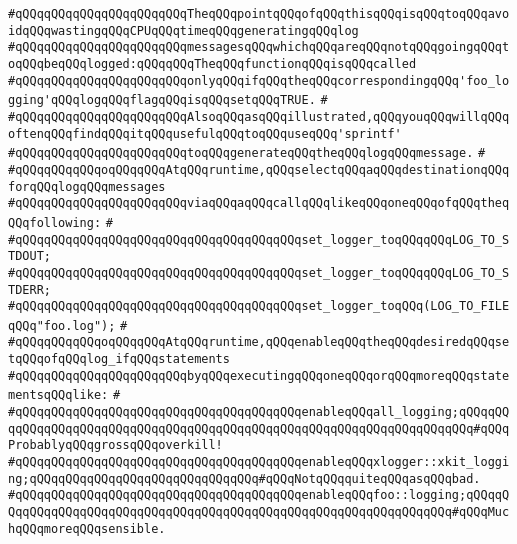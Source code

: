 \verb|#qQQqqQQqqQQqqQQqqQQqqQQqTheqQQqpointqQQqofqQQqthisqQQqisqQQqtoqQQqavoidqQQqwastingqQQqCPUqQQqtimeqQQqgeneratingqQQqlog|\newline
\verb|#qQQqqQQqqQQqqQQqqQQqqQQqmessagesqQQqwhichqQQqareqQQqnotqQQqgoingqQQqtoqQQqbeqQQqlogged:qQQqqQQqTheqQQqfunctionqQQqisqQQqcalled|\newline
\verb|#qQQqqQQqqQQqqQQqqQQqqQQqonlyqQQqifqQQqtheqQQqcorrespondingqQQq'foo_logging'qQQqlogqQQqflagqQQqisqQQqsetqQQqTRUE.|\newline
\verb|#|\newline
\verb|#qQQqqQQqqQQqqQQqqQQqqQQqAlsoqQQqasqQQqillustrated,qQQqyouqQQqwillqQQqoftenqQQqfindqQQqitqQQqusefulqQQqtoqQQquseqQQq'sprintf'|\newline
\verb|#qQQqqQQqqQQqqQQqqQQqqQQqtoqQQqgenerateqQQqtheqQQqlogqQQqmessage.|\newline
\verb|#|\newline
\verb|#qQQqqQQqqQQqoqQQqqQQqAtqQQqruntime,qQQqselectqQQqaqQQqdestinationqQQqforqQQqlogqQQqmessages|\newline
\verb|#qQQqqQQqqQQqqQQqqQQqqQQqviaqQQqaqQQqcallqQQqlikeqQQqoneqQQqofqQQqtheqQQqfollowing:|\newline
\verb|#|\newline
\verb|#qQQqqQQqqQQqqQQqqQQqqQQqqQQqqQQqqQQqqQQqset_logger_toqQQqqQQqLOG_TO_STDOUT;|\newline
\verb|#qQQqqQQqqQQqqQQqqQQqqQQqqQQqqQQqqQQqqQQqset_logger_toqQQqqQQqLOG_TO_STDERR;|\newline
\verb|#qQQqqQQqqQQqqQQqqQQqqQQqqQQqqQQqqQQqqQQqset_logger_toqQQq(LOG_TO_FILEqQQq"foo.log");|\newline
\verb|#|\newline
\verb|#qQQqqQQqqQQqoqQQqqQQqAtqQQqruntime,qQQqenableqQQqtheqQQqdesiredqQQqsetqQQqofqQQqlog_ifqQQqstatements|\newline
\verb|#qQQqqQQqqQQqqQQqqQQqqQQqbyqQQqexecutingqQQqoneqQQqorqQQqmoreqQQqstatementsqQQqlike:|\newline
\verb|#|\newline
\verb|#qQQqqQQqqQQqqQQqqQQqqQQqqQQqqQQqqQQqqQQqenableqQQqall_logging;qQQqqQQqqQQqqQQqqQQqqQQqqQQqqQQqqQQqqQQqqQQqqQQqqQQqqQQqqQQqqQQqqQQqqQQq#qQQqProbablyqQQqgrossqQQqoverkill!|\newline
\verb|#qQQqqQQqqQQqqQQqqQQqqQQqqQQqqQQqqQQqqQQqenableqQQqxlogger::xkit_logging;qQQqqQQqqQQqqQQqqQQqqQQqqQQqqQQq#qQQqNotqQQqquiteqQQqasqQQqbad.|\newline
\verb|#qQQqqQQqqQQqqQQqqQQqqQQqqQQqqQQqqQQqqQQqenableqQQqfoo::logging;qQQqqQQqqQQqqQQqqQQqqQQqqQQqqQQqqQQqqQQqqQQqqQQqqQQqqQQqqQQqqQQqqQQq#qQQqMuchqQQqmoreqQQqsensible.|\newline
